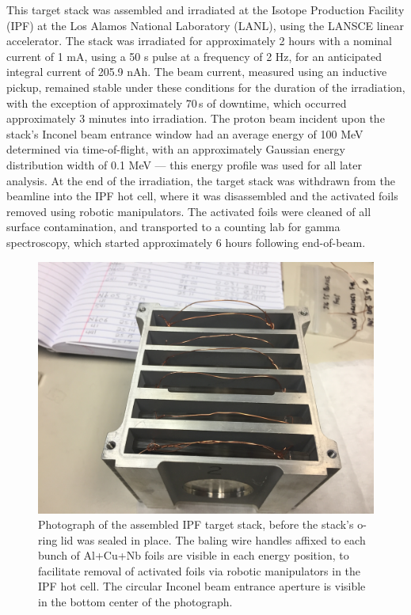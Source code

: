 \documentclass[3p]{elsarticle}
\begin{document}
This target stack was assembled and irradiated at the Isotope Production Facility (IPF) at the Los Alamos National Laboratory (LANL), using the LANSCE linear accelerator. 
The stack was irradiated for approximately 2 hours with a nominal current of 1 mA, using a 50 \micro s pulse at a frequency of 2 Hz, for an anticipated integral current of 205.9 nAh.
The beam current, measured using an inductive pickup, remained stable under these conditions for the duration of the irradiation, with the exception of approximately 70\,s of downtime, which occurred approximately 3 minutes into irradiation.
The proton beam incident upon the stack's Inconel beam entrance window had an average energy of 100 MeV determined via time-of-flight, with an approximately Gaussian energy distribution width of 0.1 MeV --- this energy profile was used for all later analysis.
At the end of the irradiation, the target stack was withdrawn from the beamline into the IPF hot cell, where it was disassembled and the activated foils removed using robotic manipulators.
The activated foils were cleaned of all surface contamination, and transported to a counting lab for gamma spectroscopy, which started approximately 6 hours following end-of-beam.





\begin{figure}
 \centering
 \includegraphics[scale=0.1,clip=true,trim=13cm 0cm 3cm 6cm]{./figures/IMG_1975.JPG}
 \caption{\label{fig:target_stack}Photograph of the assembled IPF target stack, before the stack's o-ring lid was sealed in place. The baling wire handles affixed to each bunch of Al+Cu+Nb foils are visible in each energy position, to facilitate removal of activated foils via robotic manipulators in the IPF hot cell. The circular Inconel beam entrance aperture is visible in the bottom center of the photograph.  }
\end{figure}
\end{document}

